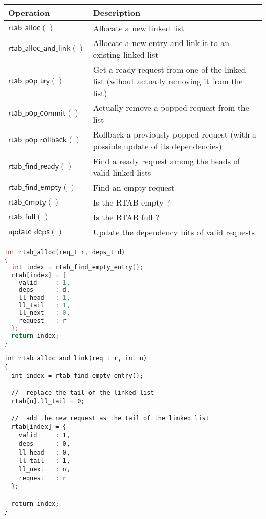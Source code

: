 \documentclass[10pt,titlepage,twoside]{book}
\begin{document}
\begin{tabular}{p{.30\linewidth}p{.70\linewidth}}
  \toprule
  \textbf{Operation}                  & \textbf{Description} \\
  \midrule
  $\mathsf{rtab\_alloc()}$            & Allocate a new linked list \\
  \midrule
  $\mathsf{rtab\_alloc\_and\_link()}$ & Allocate a new entry and link it to an existing linked list \\
  \midrule
  $\mathsf{rtab\_pop\_try()}$         & Get a ready request from one of the linked list (wihout actually removing it from the list) \\
  \midrule
  $\mathsf{rtab\_pop\_commit()}$      & Actually remove a popped request from the list \\
  \midrule
  $\mathsf{rtab\_pop\_rollback()}$    & Rollback a previously popped request (with a possible update of its dependencies) \\
  \midrule
  $\mathsf{rtab\_find\_ready()}$      & Find a ready request among the heads of valid linked lists \\
  \midrule
  $\mathsf{rtab\_find\_empty()}$      & Find an empty request \\
  \midrule
  $\mathsf{rtab\_empty()}$            & Is the RTAB empty ? \\
  \midrule
  $\mathsf{rtab\_full()}$             & Is the RTAB full ? \\
  \midrule
  $\mathsf{update\_deps()}$           & Update the dependency bits of valid requests \\
\end{tabular}

\begin{lstlisting}[language=c]
int rtab_alloc(req_t r, deps_t d)
{
  int index = rtab_find_empty_entry();
  rtab[index] = {
    valid     : 1,
    deps      : d,
    ll_head   : 1,
    ll_tail   : 1,
    ll_next   : 0,
    request   : r
  };
  return index;
}
\end{lstlisting}

\begin{lstlisting}
int rtab_alloc_and_link(req_t r, int n)
{
  int index = rtab_find_empty_entry();

  //  replace the tail of the linked list
  rtab[n].ll_tail = 0;

  //  add the new request as the tail of the linked list
  rtab[index] = {
    valid     : 1,
    deps      : 0,
    ll_head   : 0,
    ll_tail   : 1,
    ll_next   : n,
    request   : r
  };

  return index;
}
\end{lstlisting}
\end{document}
